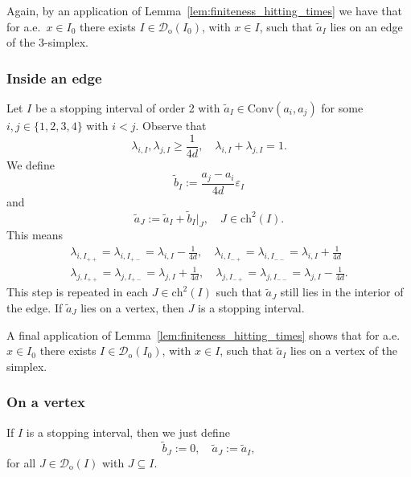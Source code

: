\documentclass{amsart}
\newcommand{\cD}{\mathcal{D}}
\newcommand{\wt}{\widetilde}
\theoremstyle{definition}
\theoremstyle{remark}
\begin{document}
Again, by an application of Lemma~\ref{lem:finiteness_hitting_times} we have that for a.e.~$x\in I_0$ there exists $I\in\cD_{\mathrm{o}}(I_0)$, with $x\in I$, such that $\wt{a}_{I}$ lies on an edge of the $3$-simplex.

\subsubsection{Inside an edge}
\label{subsub:small_step_edge}

Let $I$ be a stopping interval of order 2 with $\wt{a}_{I}\in\mathrm{Conv}(a_i,a_j)$ for some $i,j\in\{1,2,3,4\}$ with $i<j$. Observe that
\begin{equation*}
    \lambda_{i,I},\lambda_{j,I}\geq\frac{1}{4d},\quad \lambda_{i,I}+\lambda_{j,I}=1.
\end{equation*}
We define
\begin{equation*}
    \wt{b}_{I}:=\frac{a_j-a_i}{4d}\varepsilon_{I}
\end{equation*}
and
\begin{equation*}
    \wt{a}_{J}:=\wt{a}_{I}+\wt{b}_{I}|_{J},\quad J\in\mathrm{ch}^2(I).
\end{equation*}
This means
\begin{gather*}
    \lambda_{i,I_{++}}=\lambda_{i,I_{+-}}=\lambda_{i,I}-\frac{1}{4d},\quad
    \lambda_{i,I_{-+}}=\lambda_{i,I_{--}}=\lambda_{i,I}+\frac{1}{4d}\\
    \lambda_{j,I_{++}}=\lambda_{j,I_{+-}}=\lambda_{j,I}+\frac{1}{4d},\quad
    \lambda_{j,I_{-+}}=\lambda_{j,I_{--}}=\lambda_{j,I}-\frac{1}{4d}.
\end{gather*}
This step is repeated in each $J\in\mathrm{ch}^2(I)$ such that $\wt{a}_{J}$ still lies in the interior of the edge. If $\wt{a}_{J}$ lies on a vertex, then $J$ is a stopping interval.

A final application of Lemma~\ref{lem:finiteness_hitting_times} shows that for a.e.~$x\in I_0$ there exists $I\in\cD_{\mathrm{o}}(I_0)$, with $x\in I$, such that $\wt{a}_{I}$ lies on a vertex of the simplex.

\subsubsection{On a vertex}

If $I$ is a stopping interval, then we just define
\begin{equation*}
    \wt{b}_{J}:=0,\quad\wt{a}_{J}:=\wt{a}_{I},
\end{equation*}
for all $J\in\cD_{\mathrm{o}}(I)$ with $J\subseteq I$.
\end{document}

